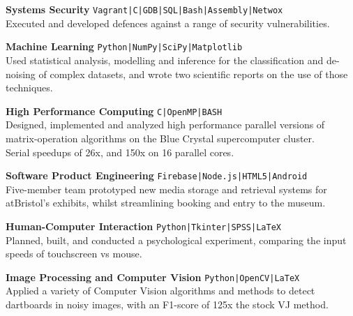 \documentclass[10pt]{article}
\newcommand{\bold}[1]{\textbf{\textcolor{dark}{#1}}}
\newcommand{\zz}[3]{{\large\bold{#1}} \hfill {\small \colorbox{light}{\texttt{#3}}}\\{#2}\vspace{0.5em}}
\newcommand{\li}{\textcolor{mid}{|}}
\begin{document}
\begin{minipage}[t]{0.65\textwidth}



\zz{Systems Security}
{Executed and developed defences against a range of security vulnerabilities.}
{Vagrant\li C\li GDB\li SQL\li Bash\li Assembly\li Netwox}

\zz{Machine Learning}
{Used statistical analysis, modelling and inference for the classification and de-noising of complex datasets, and wrote two scientific reports on the use of those techniques.}
{Python\li NumPy\li SciPy\li Matplotlib}

\zz{High Performance Computing}
{Designed, implemented and analyzed high performance parallel versions of matrix-operation algorithms on the Blue Crystal supercomputer cluster.\\
Serial speedups of 26x, and 150x on 16 parallel cores.}
{C\li OpenMP\li BASH}

\zz{Software Product Engineering}
{Five-member team prototyped new media storage and retrieval systems for atBristol's exhibits, whilst streamlining booking and entry to the museum.}{Firebase\li Node.js\li HTML5\li Android}

\zz{Human-Computer Interaction}
{Planned, built, and conducted a psychological experiment, comparing the input speeds of touchscreen vs mouse.}{Python\li Tkinter\li SPSS\li LaTeX}

\zz{Image Processing and Computer Vision}
{Applied a variety of Computer Vision algorithms and methods to detect dartboards in noisy images, with an F1-score of 125x the stock VJ method.}
{Python\li OpenCV\li LaTeX}





\end{minipage}
\end{document}
